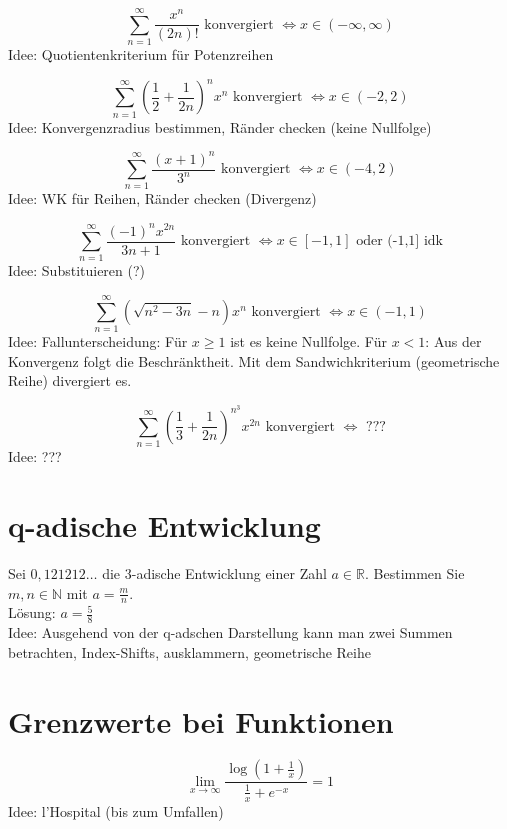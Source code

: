 \documentclass[parskip=full]{scrartcl}
\begin{document}
\begin{displaymath}
  \sum_{n = 1}^{\infty} \frac{x^n}{(2n)!} \text{ konvergiert } \iff x \in (-\infty, \infty)
\end{displaymath}
Idee: Quotientenkriterium für Potenzreihen

\begin{displaymath}
  \sum_{n = 1}^{\infty} \left(\frac{1}{2} + \frac{1}{2n}\right)^n x^n \text{ konvergiert } \iff x \in (-2,2)
\end{displaymath}
Idee: Konvergenzradius bestimmen, Ränder checken (keine Nullfolge)

\begin{displaymath}
  \sum_{n = 1}^{\infty} \frac{(x+1)^n}{3^n} \text{ konvergiert } \iff x \in (-4, 2)
\end{displaymath} 
Idee: WK für Reihen, Ränder checken (Divergenz)

\begin{displaymath}
  \sum_{n = 1}^{\infty} \frac{(-1)^n x^{2n}}{3n+1} \text{ konvergiert } \iff x \in [-1,1] \text{ oder (-1,1] idk}
\end{displaymath}
Idee: Substituieren (?)

\begin{displaymath}
  \sum_{n = 1}^{\infty} (\sqrt{n^2-3n} - n) x^n \text{ konvergiert } \iff x \in (-1,1)
\end{displaymath}
Idee: Fallunterscheidung: Für $x \geq 1$ ist es keine Nullfolge. Für $x < 1$: Aus der Konvergenz folgt die Beschränktheit. Mit dem Sandwichkriterium (geometrische Reihe) divergiert es.

\begin{displaymath}
  \sum_{n = 1}^{\infty} \left(\frac{1}{3} + \frac{1}{2n}\right)^{n^3} x^{2n} \text{ konvergiert } \iff \text{ ???}
\end{displaymath}
Idee: ???

\section{q-adische Entwicklung}
Sei $0,121212\dots$ die $3$-adische Entwicklung einer Zahl $a \in \mathbb{R}$. Bestimmen Sie $m, n \in \mathbb{N}$ mit $a = \frac{m}{n}$.\\
Lösung: $a = \frac{5}{8}$\\
Idee: Ausgehend von der q-adschen Darstellung kann man zwei Summen betrachten, Index-Shifts, ausklammern, geometrische Reihe 
\section{Grenzwerte bei Funktionen}
\begin{displaymath}
  \lim_{x \to \infty} \frac{\log\left(1 + \frac{1}{x}\right)}{\frac{1}{x} + e^{-x}} = 1
\end{displaymath}
Idee: l'Hospital (bis zum Umfallen)
\end{document}
